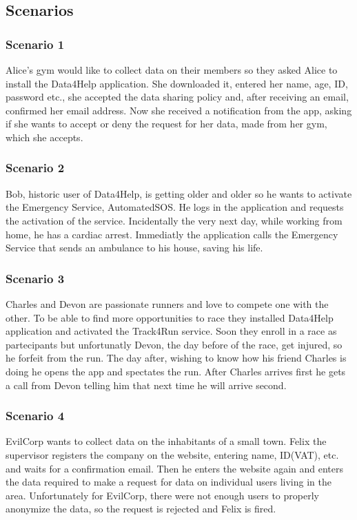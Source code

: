 \subsection{Scenarios}
\subsubsection{Scenario 1}
Alice's gym would like to collect data on their members so they asked Alice to install the Data4Help application. She downloaded it, entered her name, age, ID, password etc., she accepted the data sharing policy and, after receiving an email, confirmed her email address. Now she received a notification from the app, asking if she wants to accept or deny the request for her data, made from her gym, which she accepts.
\subsubsection{Scenario 2}
Bob, historic user of Data4Help, is getting older and older so he wants to activate the Emergency Service, AutomatedSOS. He logs in the application and requests the activation of the service.
Incidentally the very next day, while working from home, he has a cardiac arrest. Immediatly the application calls the Emergency Service that sends an ambulance to his house, saving his life.
\subsubsection{Scenario 3}
Charles and Devon are passionate runners and love to compete one with the other. To be able to find more opportunities to race they installed Data4Help application and activated the Track4Run service. Soon they enroll in a race as partecipants but unfortunatly Devon, the day before of the race, get injured, so he forfeit from the run. The day after, wishing to know how his friend Charles is doing he opens the app and spectates the run. After Charles arrives first he gets a call from Devon telling him that next time he will arrive second.
\subsubsection{Scenario 4}
EvilCorp wants to collect data on the inhabitants of a small town. Felix the supervisor registers the company on the website, entering name, ID(VAT), etc. and waits for a confirmation email. Then he enters the website again and enters the data required to make a request for data on individual users living in the area. Unfortunately for EvilCorp, there were not enough users to properly anonymize the data, so the request is rejected and Felix is fired.
